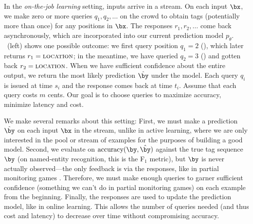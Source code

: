 In the \emph{on-the-job learning} setting, inputs arrive in a stream.
On each input $\bx$,
we make zero or more queries $q_1, q_2, \dots$ on the crowd to obtain tags
(potentially more than once)
for any positions in $\bx$.
The responses $r_1, r_2, \dots$ come back asynchronously,
which are incorporated into our current prediction model $p_\theta$.
~(left) shows one possible outcome:
we first query position $q_1 = 2$ (), which later returns $r_1 = \textsc{location}$;
in the meantime, we have queried $q_2=3$ () and gotten back $r_2 = \textsc{location}$.
When we have sufficient confidence about the entire output,
we return the most likely prediction $\hat \by$ under the model.
Each query $q_i$ is issued at time $s_i$ and the response comes back at time $t_i$.
Assume that each query costs $m$ cents.
Our goal is to choose queries to maximize accuracy, minimize latency and cost.

We make several remarks about this setting:
First, we must make a prediction $\hat \by$ on each input $\bx$ in the stream,
unlike in active learning, where we are only interested in the pool or stream of examples
for the purposes of building a good model.
Second, we evaluate on $\accuracy(\by, \byt)$ against the true tag sequence $\by$
(on named-entity recognition, this is the F$_1$ metric),
but $\by$ is never actually observed---the only feedback is via the responses,
like in partial monitoring games \citep{cesabianchi06regret}.
Therefore, we must make enough queries to garner sufficient confidence
(something we can't do in partial monitoring games)
on each example from the beginning.
Finally, the responses are used to update the prediction model, like in online learning.
This allows the number of queries needed (and thus cost and latency) to decrease over time
without compromising accuracy.


